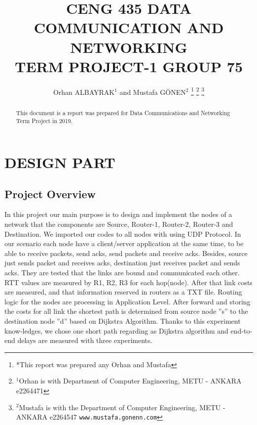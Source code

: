 \documentclass[letterpaper, 12 pt, conference]{ieeeconf}  %
\title{\LARGE \bf
CENG 435 DATA COMMUNICATION AND NETWORKING \\ TERM PROJECT-1 GROUP 75
}
\author{Orhan ALBAYRAK$^{1}$ and Mustafa GÖNEN$^{2}$%
\thanks{*This report was prepared any Orhan and Mustafa}%
\thanks{$^{1}$Orhan is with Department of Computer Engineering, METU - ANKARA e2264471
        {\tt\small}}%
\thanks{$^{2}$Mustafa is with the Department of Computer Engineering, METU - ANKARA e2264547
        {\tt\small www.mustafa.gonenn.com}}%
}
\begin{document}
\maketitle
\thispagestyle{empty}
\pagestyle{empty}


\begin{abstract}

This document is a report was prepared for Data Communications and Networking Term Project in 2019. 

\end{abstract}


\section{DESIGN PART}

\subsection{ Project Overview }

In this project our main purpose is to design and implement the nodes of a network that the components are Source, Router-1, Router-2, Router-3 and Destination. We imported our codes to all nodes with using UDP Protocol. In our scenario each node have a client/server application at the same time, to be able to receive packets, send acks, send packets and receive acks. Besides, source just sends packet and receives acks, destination just receives packet and sends acks. They are tested that the links are bound and communicated each other. RTT values are measured by R1, R2, R3 for each hop(node). After that link costs are measured, and that information reserved in routers as a TXT file. Routing logic for the nodes are processing in Application Level. After forward and storing the costs for all link the shortest path is determined from source node ”s” to the destination node ”d” based on Dijkstra Algorithm. Thanks to this experiment know-ledges, we chose one short path regarding as Dijkstra algorithm and end-to-end delays are measured with three experiments.
\end{document}
